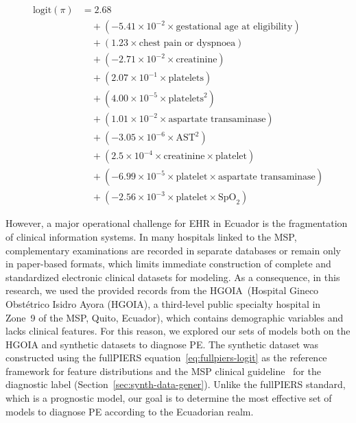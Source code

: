 \documentclass[diagnostics,article,accept,pdftex,moreauthors]{Definitions/mdpi}
\begin{document}
\begin{linenomath}
\begin{equation}
  \begin{aligned}
    \text{logit}(\pi) &= 2.68 \\ %
              &\quad + (-5.41 \times 10^{-2} \times \text{gestational age at eligibility}) \\
              &\quad + (1.23 \times \text{chest pain or dyspnoea}) \\
              &\quad + (-2.71 \times 10^{-2} \times \text{creatinine}) \\
              &\quad + (2.07 \times 10^{-1} \times \text{platelets}) \\
              &\quad + (4.00 \times 10^{-5} \times \text{platelets}^2) \\
              &\quad + (1.01 \times 10^{-2} \times \text{aspartate transaminase}) \\
              &\quad + (-3.05 \times 10^{-6} \times \text{AST}^2) \\
              &\quad + (2.5 \times 10^{-4} \times \text{creatinine} \times \text{platelet}) \\
              &\quad + (-6.99 \times 10^{-5} \times \text{platelet} \times \text{aspartate transaminase}) \\
              &\quad + (-2.56 \times 10^{-3} \times \text{platelet} \times \text{SpO}_2)
  \end{aligned}
    \label{eq:fullpiers-logit}
\end{equation}
\end{linenomath}

However, a major operational challenge for \ac{EHR} in Ecuador
is the fragmentation of clinical information systems. In many
hospitals linked to the \ac{MSP}, complementary examinations are
recorded in separate databases or remain only in paper-based formats,
which limits immediate construction of complete and standardized
electronic clinical datasets for modeling. As a consequence, in this
research, we used the provided records from the
\ac{HGOIA}~({{Hospital Gineco Obstétrico Isidro Ayora (HGOIA),}
 a
  third-level public specialty hospital in Zone~9 of the \ac{MSP},
  Quito, Ecuador}), which contains demographic variables and lacks
clinical features. For this reason, we explored our sets of models
both on the \ac{HGOIA} and synthetic datasets to diagnose
\ac{PE}. The synthetic dataset was constructed using the
full\ac{PIERS} equation~\eqref{eq:fullpiers-logit} as the
reference framework for feature distributions and the
\ac{MSP} clinical guideline~\cite{msp_ecuador_hdp_2013} for
the diagnostic label (Section~\ref{sec:synth-data-gener}). Unlike the full\ac{PIERS} standard, which is a
prognostic model, our goal is to determine the most effective set of
models to diagnose \ac{PE} according to the Ecuadorian realm.
\end{document}
